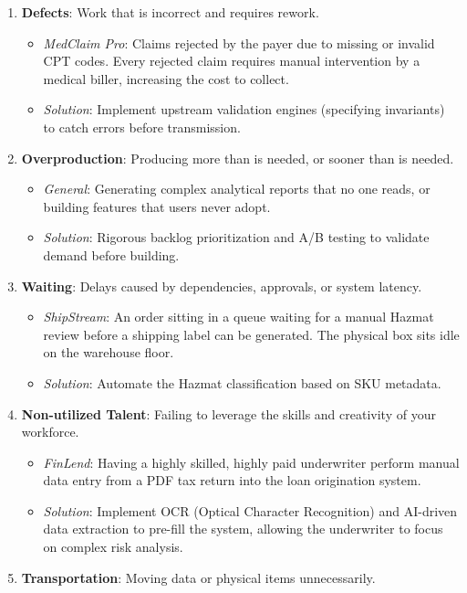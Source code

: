 \begin{enumerate}
\def\labelenumi{\arabic{enumi}.}
\tightlist
\item
  \textbf{Defects}: Work that is incorrect and requires rework.

  \begin{itemize}
  \tightlist
  \item
    \emph{MedClaim Pro}: Claims rejected by the payer due to missing or
    invalid CPT codes. Every rejected claim requires manual intervention
    by a medical biller, increasing the cost to collect.
  \item
    \emph{Solution}: Implement upstream validation engines (specifying
    invariants) to catch errors before transmission.
  \end{itemize}
\item
  \textbf{Overproduction}: Producing more than is needed, or sooner than
  is needed.

  \begin{itemize}
  \tightlist
  \item
    \emph{General}: Generating complex analytical reports that no one
    reads, or building features that users never adopt.
  \item
    \emph{Solution}: Rigorous backlog prioritization and A/B testing to
    validate demand before building.
  \end{itemize}
\item
  \textbf{Waiting}: Delays caused by dependencies, approvals, or system
  latency.

  \begin{itemize}
  \tightlist
  \item
    \emph{ShipStream}: An order sitting in a queue waiting for a manual
    Hazmat review before a shipping label can be generated. The physical
    box sits idle on the warehouse floor.
  \item
    \emph{Solution}: Automate the Hazmat classification based on SKU
    metadata.
  \end{itemize}
\item
  \textbf{Non-utilized Talent}: Failing to leverage the skills and
  creativity of your workforce.

  \begin{itemize}
  \tightlist
  \item
    \emph{FinLend}: Having a highly skilled, highly paid underwriter
    perform manual data entry from a PDF tax return into the loan
    origination system.
  \item
    \emph{Solution}: Implement OCR (Optical Character Recognition) and
    AI-driven data extraction to pre-fill the system, allowing the
    underwriter to focus on complex risk analysis.
  \end{itemize}
\item
  \textbf{Transportation}: Moving data or physical items unnecessarily.


\end{enumerate}
